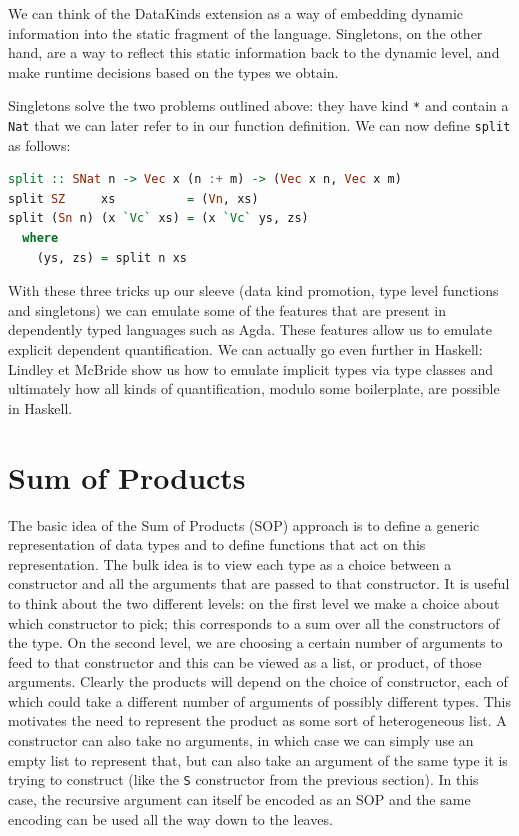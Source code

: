 \documentclass[11pt]{article}
\begin{document}
We can think of the DataKinds extension as a way of embedding dynamic information into the static fragment of 
the language. Singletons, on the other hand, are a way to reflect this static information back to 
the dynamic level, and make runtime decisions based on the types we obtain.


Singletons solve the two problems outlined above: they have kind \texttt{*}
and contain a \texttt{Nat} that we can later refer to in our
function definition. We can now define \texttt{split} as follows:

\begin{lstlisting}[language=haskell]
split :: SNat n -> Vec x (n :+ m) -> (Vec x n, Vec x m)
split SZ     xs          = (Vn, xs)
split (Sn n) (x `Vc` xs) = (x `Vc` ys, zs)
  where
    (ys, zs) = split n xs
\end{lstlisting}

With these three tricks up our sleeve (data kind promotion, type level
functions and singletons) we can emulate some of the features that are
present in dependently typed languages such as Agda. These features allow us to 
emulate explicit dependent quantification. We can actually go even further in 
Haskell: Lindley et McBride \cite{hasochism} show us how to emulate implicit types via type 
classes and ultimately how all kinds of quantification, modulo some boilerplate, are possible in 
Haskell.

\section{Sum of Products}\label{SOP}


The basic idea of the Sum of Products (SOP) approach is to define a generic representation of data types and 
to define functions that act on this representation.
The bulk idea is to view each type as a choice between a constructor and all the arguments that are passed to
that constructor. It is useful to think about the two different levels: on the first level we 
make a choice about which constructor to pick; this corresponds to a sum
over all the constructors of the type. On the second level, we are choosing a certain number of arguments 
to feed to that constructor and this can be viewed as a list, or product, of 
those arguments. Clearly the products will depend on the choice of constructor, 
each of which could take a different number of arguments of possibly 
different types. This motivates the need to represent the product as some sort 
of heterogeneous list. A constructor can also take no arguments, in which case we 
can simply use an empty list to represent that, but can also take an argument of 
the same type it is trying to construct (like the \texttt{S} constructor from the previous section). 
In this case, the recursive argument can itself be encoded as an SOP 
and the same encoding can be used all the way down to the leaves. 
\end{document}
